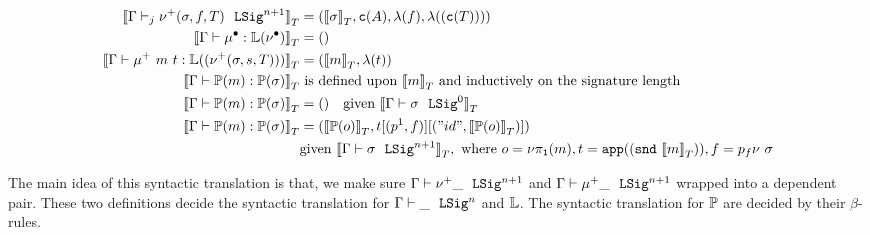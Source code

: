 \begin{align*}
  \denotesT{\goodSigU{j}{\Gamma}{\LSigAdd{\sigma}{f}{T}}{n+1}} &= (\denotesT{\sigma}, \codety{A}, \lam{f}, \lam{(\codety{T})}) \\ 
  \denotesT{\goodTerm{\Gamma}{\LkgEmp}{\TyLkg{\LSigEmp}}} &= \unit \\ 
  \denotesT{\goodTerm{\Gamma}{\mu^+~m~t}{\TyLkg{(\LSigAdd{\sigma}{s}{T})}}} &= (\denotesT{m}, \lam{t}) \\ 
  \denotesT{\goodTerm{\Gamma}{\Tkg{m}}{\TyTkg {\sigma}}} & \text{ is defined upon } \denotesT{m} \text{ and inductively on the signature length} \\ 
  \denotesT{\goodTerm{\Gamma}{\Tkg {m}}{\TyTkg {\sigma}}} &= () \quad \text{given } \denotesT{\goodSig{\Gamma}{\sigma}{0}} \\
  \denotesT{\goodTerm{\Gamma}{\Tkg {m}}{\TyTkg {\sigma}}} &= 
  (\denotesT{\Tkg {o}}, t[(\SubstExt{p^1}{f})][(\SubstExt{"id"}{\denotesT{\Tkg {o}}})]) \\
  & \text{given } \denotesT{\goodSig{\Gamma}{\sigma}{n+1}}, \text{ where } o = \lsigproj{1}{m}, t = \app{(\snd{\denotesT{m}})}, f = p_f\nu~\sigma 
\end{align*}



The main idea of this syntactic translation is that, we make sure
$\goodSig{\Gamma}{\nu^+ \_ }{n+1}$ and $\goodSig{\Gamma}{\mu^+ \_}{n+1}$
wrapped into a dependent pair. These two definitions decide the
syntactic translation for $\goodSig{\Gamma}{\_}{n}$ and $\cL$. The
syntactic translation for $\cP$ are decided by their
$\beta$-rules. 


